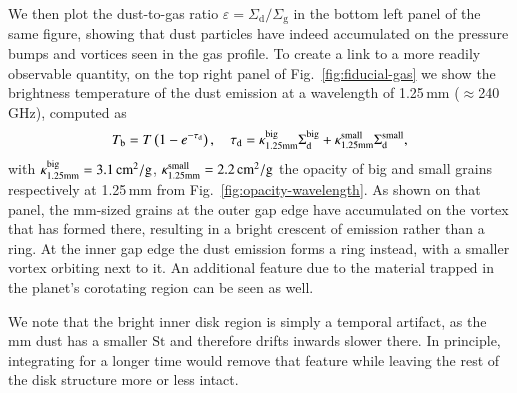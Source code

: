 \documentclass[fleqn,usenatbib,useAMS]{mnras}
\newcommand{\Sigmag}{\Sigma_\mathrm{g}}
\newcommand{\Sigmad}{\Sigma_\mathrm{d}}
\newcommand{\St}{\mathrm{St}}
\begin{document}
We then plot the dust-to-gas ratio $\varepsilon=\Sigmad/\Sigmag$ in the bottom left panel of the same figure, showing that dust particles have indeed accumulated on the pressure bumps and vortices seen in the gas profile. To create a link to a more readily observable quantity, on the top right panel of Fig.~\ref{fig:fiducial-gas} we show the brightness temperature of the dust emission at a wavelength of 1.25\,mm ($\approx$240\,GHz), computed as
%
\begin{equation}
	\label{eq:brightness-temperature}
	T_\text{b} = T \left(1-e^{-\tau_\text{d}}\right), \quad\tau_\text{d}=\kappa^\text{big}_\text{1.25\text{mm}}\Sigmad^\text{big} + \kappa^\text{small}_\text{1.25\text{mm}}\Sigmad^\text{small},
\end{equation}
%
with $\kappa^\text{big}_\text{1.25\text{mm}}=3.1\,\text{cm}^2/\text{g}$, $\kappa^\text{small}_\text{1.25\text{mm}}=2.2\,\text{cm}^2/\text{g}$ the opacity of big and small grains respectively at 1.25\,mm from Fig.~\ref{fig:opacity-wavelength}. As shown on that panel, the mm-sized grains at the outer gap edge have accumulated on the vortex that has formed there, resulting in a bright crescent of emission rather than a ring. At the inner gap edge the dust emission forms a ring instead, with a smaller vortex orbiting next to it. An additional feature due to the material trapped in the planet's corotating region can be seen as well.

We note that the bright inner disk region is simply a temporal artifact, as the mm dust has a smaller $\St$ and therefore drifts inwards slower there. In principle, integrating for a longer time would remove that feature while leaving the rest of the disk structure more or less intact.
\end{document}
